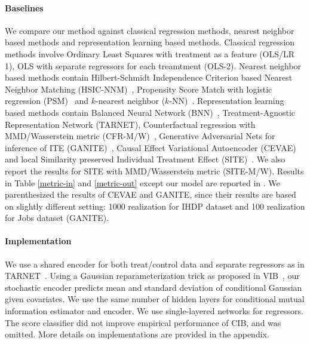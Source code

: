 \documentclass{article}
\begin{document}
\vspace{-.1cm}
    \paragraph{Baselines} We compare our method against classical regression methods, nearest neighbor based methods and representation learning based methods. Classical regression methods involve Ordinary Least Squares with treatment as a feature (OLS/LR 1), OLS with separate regressors for each treamtment (OLS-2). Nearest neighbor based methods contain Hilbert-Schmidt Independence Criterion based Nearest Neighbor Matching (HSIC-NNM)~\cite{chang2017informative}, Propensity Score Match with logistic regression (PSM)~\cite{rosenbaum1983central} and $k$-nearest neighbor ($k$-NN)~\cite{crump2008nonparametric}. Representation learning based methods contain Balanced Neural Network (BNN)~\cite{johansson16}, Treatment-Agnostic Representation Network (TARNET), Counterfactual regression with MMD/Wasserstein metric (CFR-M/W)~\cite{Shalit17}, Generative Adversarial Nets for inference of ITE (GANITE)~\cite{yoon2018ganite}, Causal Effect Variational Autoencoder (CEVAE)~\cite{Louizos17} and local Similarity preserved Individual Treatment Effect (SITE)~\cite{yao2018}. We also report the results for SITE with MMD/Wasserstein metric (SITE-M/W). Results in Table \ref{metric-in} and \ref{metric-out} except our model are reported in \cite{yoon2018ganite, Louizos17, yao2018}. We parenthesized the results of CEVAE and GANITE, since their results are based on slightly different setting: 1000 realization for IHDP dataset and 100 realization for Jobs dataset (GANITE).
    
    \vspace{-.1cm}
    \paragraph{Implementation} We use a shared encoder for both treat/control data and separate regressors as in TARNET~\cite{Shalit17}.  Using a Gaussian reparameterization trick as proposed in VIB~\cite{Alemi17}, our stochastic encoder predicts mean and standard deviation of conditional Gaussian given covariates. We use the same number of hidden layers for conditional mutual information estimator and encoder. We use single-layered networks for regressors. The score classifier did not improve empirical performance of CIB, and was omitted. More details on implementations are provided in the appendix. 

\vspace{-.1cm}
\end{document}
